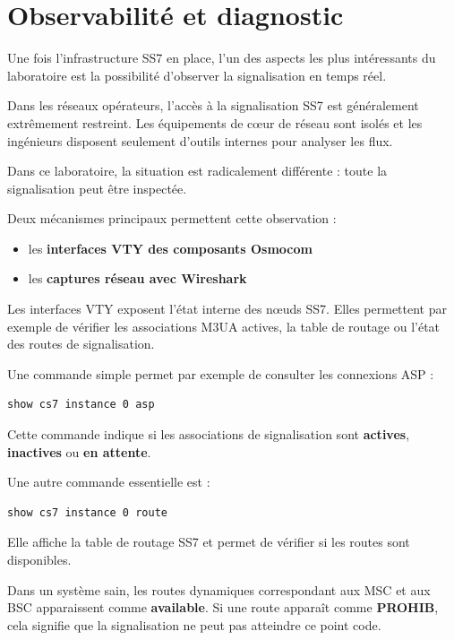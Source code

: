 \documentclass[
]{article}
\providecommand{\tightlist}{%
  \setlength{\itemsep}{0pt}\setlength{\parskip}{0pt}}
\begin{document}
\section{Observabilité et
diagnostic}\label{observabilituxe9-et-diagnostic}

Une fois l'infrastructure SS7 en place, l'un des aspects les plus
intéressants du laboratoire est la possibilité d'observer la
signalisation en temps réel.

Dans les réseaux opérateurs, l'accès à la signalisation SS7 est
généralement extrêmement restreint. Les équipements de cœur de réseau
sont isolés et les ingénieurs disposent seulement d'outils internes pour
analyser les flux.

Dans ce laboratoire, la situation est radicalement différente : toute la
signalisation peut être inspectée.

Deux mécanismes principaux permettent cette observation :

\begin{itemize}
\tightlist
\item
  les \textbf{interfaces VTY des composants Osmocom}
\item
  les \textbf{captures réseau avec Wireshark}
\end{itemize}

Les interfaces VTY exposent l'état interne des nœuds SS7. Elles
permettent par exemple de vérifier les associations M3UA actives, la
table de routage ou l'état des routes de signalisation.

Une commande simple permet par exemple de consulter les connexions ASP :

\begin{verbatim}
show cs7 instance 0 asp
\end{verbatim}

Cette commande indique si les associations de signalisation sont
\textbf{actives}, \textbf{inactives} ou \textbf{en attente}.

Une autre commande essentielle est :

\begin{verbatim}
show cs7 instance 0 route
\end{verbatim}

Elle affiche la table de routage SS7 et permet de vérifier si les routes
sont disponibles.

Dans un système sain, les routes dynamiques correspondant aux MSC et aux
BSC apparaissent comme \textbf{available}. Si une route apparaît comme
\textbf{PROHIB}, cela signifie que la signalisation ne peut pas
atteindre ce point code.
\end{document}

